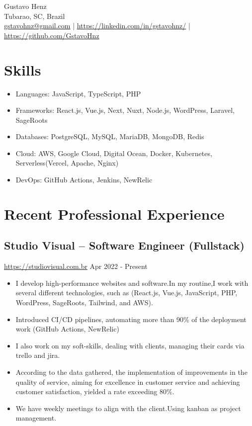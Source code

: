 \documentclass[11pt, a4paper]{article}
\begin{document}
\begin{center}
    {\Huge Gustavo Henz}\\
    \vspace{0.2cm}
    Tubarao, SC, Brazil\\
    \href{mailto:gstavohnz@gmail.com}{gstavohnz@gmail.com} | \href{https://www.linkedin.com/in/gstavohnz/}{https://linkedin.com/in/gstavohnz/} | \href{https://www.github.com/GstavoHnz}{https://github.com/GstavoHnz}
\end{center}

\section*{Skills}
\begin{itemize}[noitemsep]
    \item Languages: JavaScript, TypeScript, PHP
    \item Frameworks: React.js, Vue.js, Next, Nuxt, Node.js, WordPress, Laravel, SageRoots
    \item Databases: PostgreSQL, MySQL, MariaDB, MongoDB, Redis
    \item Cloud: AWS, Google Cloud, Digital Ocean, Docker, Kubernetes, Serverless(Vercel, Apache, Nginx)
    \item DevOps: GitHub Actions, Jenkins, NewRelic
\end{itemize}

\section*{Recent Professional Experience}
\subsection*{Studio Visual -- Software Engineer (Fullstack)}
\href{https://www.studiovisual.com.br}{https://studiovisual.com.br} \hfill Apr 2022 - Present
\begin{itemize}[noitemsep]
    \item I develop high-performance websites and software.In my routine,I work with several different technologies, such as (React.js, Vue.js, JavaScript, PHP, WordPress, SageRoots, Tailwind, and AWS).
    \item Introduced CI/CD pipelines, automating more than 90\% of the deployment work (GitHub Actions, NewRelic)
    \item I also work on my soft-skills, dealing with clients, managing their cards via trello and jira.
    \item According to the data gathered, the implementation of improvements in the quality of service, aiming for excellence in customer service and achieving customer satisfaction, yielded a rate exceeding 80\%.  
    \item We have weekly meetings to align with the client.Using kanban as project management.
\end{itemize}
\end{document}
